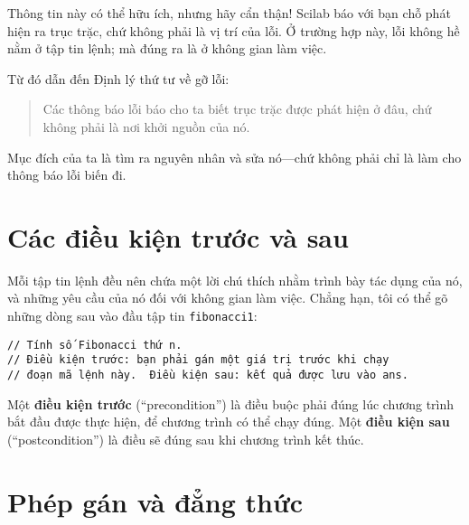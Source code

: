 \documentclass[12pt]{book}
\begin{document}
Thông tin này có thể hữu ích, nhưng hãy cẩn thận! Scilab báo với
bạn chỗ phát hiện ra trục trặc, chứ không phải là vị trí của lỗi. Ở
trường hợp này, lỗi không hề nằm ở tập tin lệnh; mà đúng ra là ở
không gian làm việc.

Từ đó dẫn đến Định lý thứ tư về gỡ lỗi:

\begin{quote}
Các thông báo lỗi báo cho ta biết trục trặc được phát hiện ở đâu, chứ
không phải là nơi khởi nguồn của nó.
\end{quote}

Mục đích của ta là tìm ra nguyên nhân và sửa nó---chứ không phải 
chỉ là làm cho thông báo lỗi biến đi.


\section{Các điều kiện trước và sau}

Mỗi tập tin lệnh đều nên chứa một lời chú thích nhằm trình bày 
tác dụng của nó, và những yêu cầu của nó đối với không gian 
làm việc. Chẳng hạn, tôi có thể gõ những dòng sau vào đầu
tập tin {\tt fibonacci1}:

\begin{verbatim}
// Tính số Fibonacci thứ n.  
// Điều kiện trước: bạn phải gán một giá trị trước khi chạy
// đoạn mã lệnh này.  Điều kiện sau: kết quả được lưu vào ans.
\end{verbatim}
%
Một {\bf điều kiện trước} (``precondition'') là điều buộc phải đúng
lúc chương trình bắt đầu được thực hiện, để chương trình có thể chạy đúng.
Một {\bf điều kiện sau} (``postcondition'') là điều sẽ đúng sau khi
chương trình kết thúc.

%
%


\section{Phép gán và đẳng thức}
\end{document}
